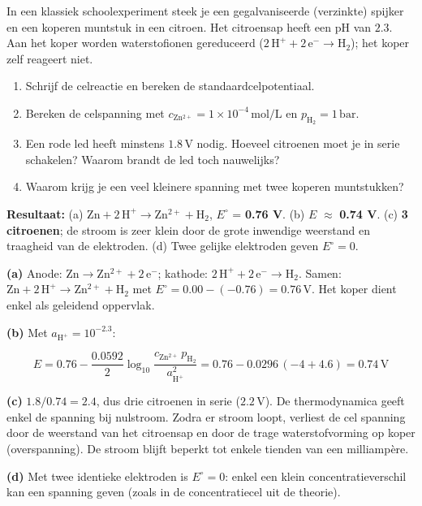 \begin{oefening}
In een klassiek schoolexperiment steek je een gegalvaniseerde (verzinkte) spijker en een koperen muntstuk in een citroen. Het citroensap heeft een pH van \(2.3\). Aan het koper worden waterstofionen gereduceerd (\(\mathrm{2\,H^+ + 2\,e^- \rightarrow H_2}\)); het koper zelf reageert niet.

\begin{enumerate}
\item[(a)]
  Schrijf de celreactie en bereken de standaardcelpotentiaal.
\item[(b)]
  Bereken de celspanning met \(c_{\mathrm{Zn^{2+}}} = 1\times10^{-4}\,\mathrm{mol/L}\) en \(p_{\mathrm{H_2}} = 1\,\mathrm{bar}\).
\item[(c)]
  Een rode led heeft minstens \(1.8\,\mathrm{V}\) nodig. Hoeveel citroenen moet je in serie schakelen? Waarom brandt de led toch nauwelijks?
\item[(d)]
  Waarom krijg je een veel kleinere spanning met twee koperen muntstukken?
\end{enumerate}
\end{oefening}
\begin{oplossing}
\textbf{Resultaat:} (a) \(\mathrm{Zn + 2\,H^+ \rightarrow Zn^{2+} + H_2}\), \(E^\circ\) = \textbf{0.76 V}. (b) \(E\) \ensuremath{\approx{}} \textbf{0.74 V}. (c) \textbf{3 citroenen}; de stroom is zeer klein door de grote inwendige weerstand en traagheid van de elektroden. (d) Twee gelijke elektroden geven \(E^\circ = 0\).

\textbf{(a)} Anode: \(\mathrm{Zn \rightarrow Zn^{2+} + 2\,e^-}\); kathode: \(\mathrm{2\,H^+ + 2\,e^- \rightarrow H_2}\). Samen: \(\mathrm{Zn + 2\,H^+ \rightarrow Zn^{2+} + H_2}\) met \(E^\circ = 0.00 - (-0.76) = 0.76\,\mathrm{V}\). Het koper dient enkel als geleidend oppervlak.

\textbf{(b)} Met \(a_{\mathrm{H^+}} = 10^{-2.3}\):

\[
E = 0.76 - \frac{0.0592}{2}\log_{10}\frac{c_{\mathrm{Zn^{2+}}}\,p_{\mathrm{H_2}}}{a_{\mathrm{H^+}}^2} = 0.76 - 0.0296\,(-4 + 4.6) = 0.74\,\mathrm{V}
\]

\textbf{(c)} \(1.8/0.74 = 2.4\), dus drie citroenen in serie (\(2.2\,\mathrm{V}\)). De thermodynamica geeft enkel de spanning bij nulstroom. Zodra er stroom loopt, verliest de cel spanning door de weerstand van het citroensap en door de trage waterstofvorming op koper (overspanning). De stroom blijft beperkt tot enkele tienden van een milliampère.

\textbf{(d)} Met twee identieke elektroden is \(E^\circ = 0\): enkel een klein concentratieverschil kan een spanning geven (zoals in de concentratiecel uit de theorie).
\end{oplossing}

